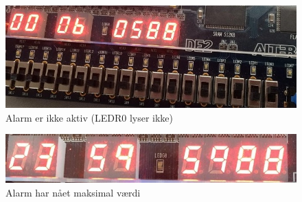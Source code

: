 \begin{enumerate}
\begin{figure}[h]
	\centering
	\includegraphics[scale=0.45]{pictures/Oevelse6/opg3/AlarmOff.JPG}
	\caption{Alarm er ikke aktiv (LEDR0 lyser ikke)}
	\label{fig:alarmOff}
\end{figure}

\begin{figure}[h]
	\centering
	\includegraphics[scale=0.45]{pictures/Oevelse6/opg3/AlarmMaxValue.JPG}
	\caption{Alarm har nået maksimal værdi}
	\label{fig:alarmMaxValue}
\end{figure}


\end{enumerate}
	